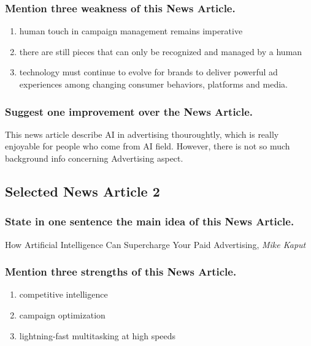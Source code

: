 \documentclass[12pt]{article}%
\begin{document}
\subsubsection{Mention three weakness of this News Article.}

\begin{enumerate}
\item human touch in campaign management remains imperative
\item there are still pieces that can only be recognized and managed by a human
\item technology must continue to evolve for brands to deliver powerful ad experiences among changing consumer behaviors, platforms and media.
\end{enumerate}


\subsubsection{Suggest one improvement over the News Article.}

This news article describe AI in advertising thouroughtly, which is really enjoyable for people who come from AI field. However, there is not so much background info concerning Advertising aspect.


\subsection{Selected News Article 2}

\subsubsection{State in one sentence the main idea of this News Article.}

How Artificial Intelligence Can Supercharge Your Paid Advertising, \textit{Mike Kaput}


\subsubsection{Mention three strengths of this News Article.}

\begin{enumerate}
\item competitive intelligence
\item campaign optimization
\item lightning-fast multitasking at high speeds
\end{enumerate}
\end{document}

